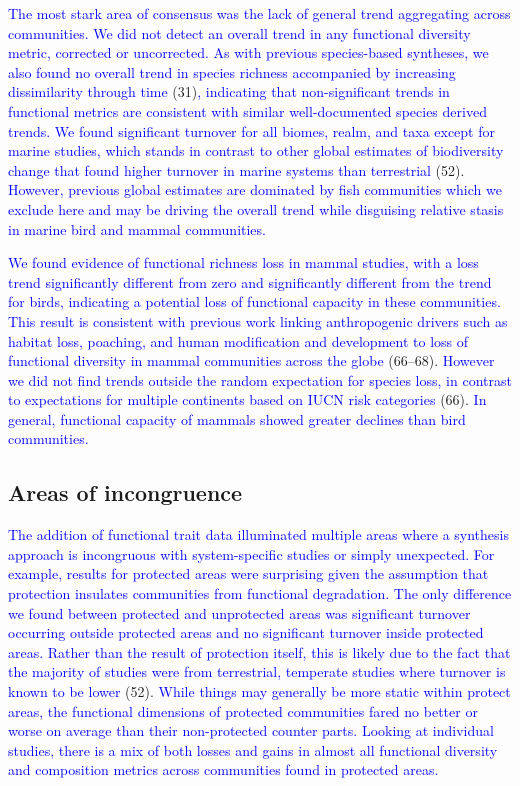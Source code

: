 \documentclass{article}
\begin{document}
\textcolor{blue}{The most stark area of consensus was the lack of general trend aggregating across communities. We did not detect an overall trend in any functional diversity metric, corrected or uncorrected. As with previous species-based syntheses, we also found no overall trend in species richness accompanied by increasing dissimilarity through time}
(31)\textcolor{blue}{, indicating that non-significant trends in functional metrics are consistent with similar well-documented species derived trends. We found significant turnover for all biomes, realm, and taxa except for marine studies, which stands in contrast to other global estimates of biodiversity change that found higher turnover in marine systems than terrestrial}
(52).
\textcolor{blue}{However, previous global estimates are dominated by fish communities which we exclude here and may be driving the overall trend while disguising relative stasis in marine bird and mammal communities.}

\textcolor{blue}{We found evidence of functional richness loss in mammal studies, with a loss trend significantly different from zero and significantly different from the trend for birds, indicating a potential loss of functional capacity in these communities. This result is consistent with previous work linking anthropogenic drivers such as habitat loss, poaching, and human modification and development to loss of functional diversity in mammal communities across the globe}
(66--68).
\textcolor{blue}{However we did not find trends outside the random expectation for species loss, in contrast to expectations for multiple continents based on IUCN risk categories}
(66).
\textcolor{blue}{In general, functional capacity of mammals showed greater declines than bird communities.}

\hypertarget{areas-of-incongruence}{%
\subsection{Areas of incongruence}\label{areas-of-incongruence}}

\textcolor{blue}{The addition of functional trait data illuminated multiple areas where a synthesis approach is incongruous with system-specific studies or simply unexpected. For example, results for protected areas were surprising given the assumption that protection insulates communities from functional degradation. The only difference we found between protected and unprotected areas was significant turnover occurring outside protected areas and no significant turnover inside protected areas. Rather than the result of protection itself, this is likely due to the fact that the majority of studies were from terrestrial, temperate studies where turnover is known to be lower }(52).
\textcolor{blue}{While things may generally be more static within protect areas, the functional dimensions of protected communities fared no better or worse on average than their non-protected counter parts. Looking at individual studies, there is a mix of both losses and gains in almost all functional diversity and composition metrics across communities found in protected areas.}
\end{document}
